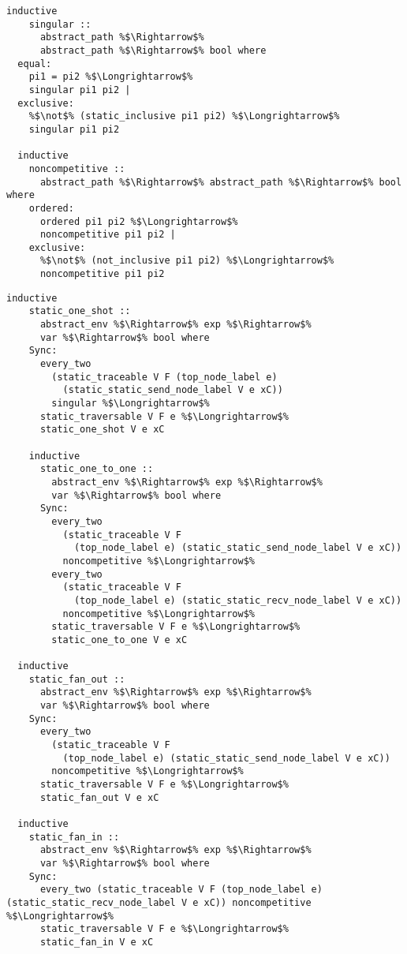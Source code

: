 \documentclass{article}
\begin{document}
\begin{lstlisting}[style=codestyle1, escapechar=\%]
  inductive
    singular ::
      abstract_path %$\Rightarrow$%
      abstract_path %$\Rightarrow$% bool where
  equal:
    pi1 = pi2 %$\Longrightarrow$% 
    singular pi1 pi2 |
  exclusive:
    %$\not$% (static_inclusive pi1 pi2) %$\Longrightarrow$% 
    singular pi1 pi2

  inductive
    noncompetitive ::
      abstract_path %$\Rightarrow$% abstract_path %$\Rightarrow$% bool where
    ordered:
      ordered pi1 pi2 %$\Longrightarrow$% 
      noncompetitive pi1 pi2 |
    exclusive:
      %$\not$% (not_inclusive pi1 pi2) %$\Longrightarrow$% 
      noncompetitive pi1 pi2
  \end{lstlisting}

\begin{lstlisting}[style=codestyle1, escapechar=\%]
  inductive
    static_one_shot ::
      abstract_env %$\Rightarrow$% exp %$\Rightarrow$%
      var %$\Rightarrow$% bool where
    Sync:
      every_two
        (static_traceable V F (top_node_label e)
          (static_static_send_node_label V e xC))
        singular %$\Longrightarrow$%
      static_traversable V F e %$\Longrightarrow$%
      static_one_shot V e xC 

    inductive
      static_one_to_one ::
        abstract_env %$\Rightarrow$% exp %$\Rightarrow$%
        var %$\Rightarrow$% bool where
      Sync:
        every_two
          (static_traceable V F
            (top_node_label e) (static_static_send_node_label V e xC))
          noncompetitive %$\Longrightarrow$%
        every_two
          (static_traceable V F
            (top_node_label e) (static_static_recv_node_label V e xC))
          noncompetitive %$\Longrightarrow$%
        static_traversable V F e %$\Longrightarrow$%
        static_one_to_one V e xC 

  inductive
    static_fan_out ::
      abstract_env %$\Rightarrow$% exp %$\Rightarrow$%
      var %$\Rightarrow$% bool where
    Sync:
      every_two
        (static_traceable V F
          (top_node_label e) (static_static_send_node_label V e xC))
        noncompetitive %$\Longrightarrow$%
      static_traversable V F e %$\Longrightarrow$%
      static_fan_out V e xC 

  inductive
    static_fan_in ::
      abstract_env %$\Rightarrow$% exp %$\Rightarrow$%
      var %$\Rightarrow$% bool where
    Sync:
      every_two (static_traceable V F (top_node_label e) (static_static_recv_node_label V e xC)) noncompetitive %$\Longrightarrow$%
      static_traversable V F e %$\Longrightarrow$%
      static_fan_in V e xC
    \end{lstlisting}
\end{document}

